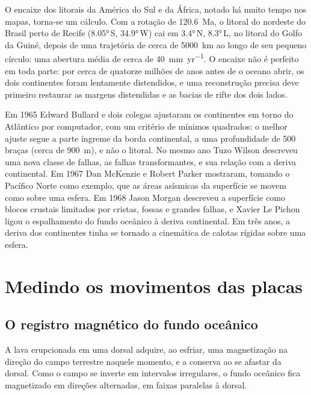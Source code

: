 O encaixe dos litorais da América do Sul e da África, notado há muito tempo nos mapas,
torna-se um cálculo. Com a rotação de
\qty{120.6}{Ma}, o litoral do nordeste do Brasil perto de Recife (\ang{8.05}\,S,
\ang{34.9}\,W) cai em \ang{3.4}\,N, \ang{8.3}\,L, no litoral do Golfo da
Guiné, depois de uma trajetória de cerca de \qty{5000}{km} ao longo de seu pequeno círculo: uma
abertura média de cerca de \qty{40}{mm.yr^{-1}}. O encaixe não é perfeito
em toda parte: por cerca de quatorze milhões de anos antes de o oceano abrir, os dois
continentes foram lentamente distendidos, e uma reconstrução precisa deve primeiro
restaurar as margens distendidas e as bacias de rifte dos dois lados.

\begin{history}
Em 1965 Edward Bullard e dois colegas ajustaram os continentes em torno do Atlântico por computador, com um critério de mínimos quadrados: o melhor ajuste segue a parte íngreme da borda continental, a uma profundidade de 500 braças (cerca de
\qty{900}{m}), e não o litoral. No mesmo ano Tuzo Wilson descreveu uma nova classe de falhas, as falhas transformantes, e sua relação com a deriva continental.
Em 1967 Dan McKenzie e Robert Parker mostraram, tomando o Pacífico Norte como exemplo, que as áreas asísmicas da superfície se movem como  sobre uma
esfera. Em 1968 Jason Morgan descreveu a superfície como blocos crustais limitados por cristas, fossas e grandes falhas, e Xavier Le Pichon ligou o espalhamento do fundo oceânico à deriva continental. Em três anos, a deriva dos continentes tinha se tornado a cinemática de calotas rígidas sobre uma esfera.
\end{history}

\section{Medindo os movimentos das placas}

\subsection*{O registro magnético do fundo oceânico}

A lava erupcionada em uma dorsal adquire, ao esfriar, uma magnetização na direção
do campo terrestre naquele momento, e a conserva ao se afastar da
dorsal. Como o campo se inverte em intervalos irregulares, o fundo oceânico fica
magnetizado em direções alternadas, em faixas paralelas à dorsal.

